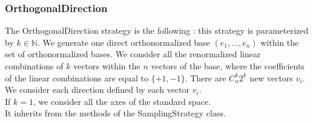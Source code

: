 \newpage \subsubsection{OrthogonalDirection}

The OrthogonalDirection strategy is the following : this strategy is parameterized by $k\in \mathbb{N}$. We generate one direct orthonormalized base $(e_1, \dots, e_n)$ within the set of orthonormalized bases. We consider all the renormalized linear combinations of $k$ vectors within the $n$ vectors of the base, where the coefficients of the linear combinations are equal to $\{+1, -1\}$. There are $C_n^k 2^k$ new vectors $v_i$. We consider each direction defined by each vector $v_i$.\\
If $k=1$, we consider all the axes of the standard space.\\


It inherits from the methods of the SamplingStrategy class.


